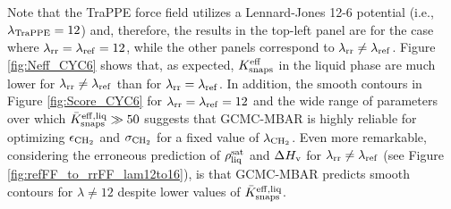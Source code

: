 \documentclass[journal=jced,manuscript=article]{achemso}
\begin{document}
Note that the TraPPE force field utilizes a Lennard-Jones 12-6 potential (i.e., $\lambda_{\rm TraPPE} = 12$) and, therefore, the results in the top-left panel are for the case where $\lambda_{\rm rr} = \lambda_{\rm ref} = 12$, while the other panels correspond to $\lambda_{\rm rr} \neq \lambda_{\rm ref}$. Figure \ref{fig:Neff_CYC6} shows that, as expected, $K_{\rm snaps}^{\rm eff}$ in the liquid phase are much lower for $\lambda_{\rm rr} \neq \lambda_{\rm ref}$ than for $\lambda_{\rm rr} = \lambda_{\rm ref}$. In addition, the smooth contours in Figure \ref{fig:Score_CYC6} for $\lambda_{\rm rr} = \lambda_{\rm ref} = 12$ and the wide range of parameters over which $\bar K_{\rm snaps}^{\rm eff, liq} \gg 50$ suggests that GCMC-MBAR is highly reliable for optimizing $\epsilon_{\rm CH_2}$ and $\sigma_{\rm CH_2}$ for a fixed value of $\lambda_{\rm CH_2}$. 
Even more remarkable, considering the erroneous prediction of $\rho_{\rm liq}^{\rm sat}$ and $\Delta H_{\rm v}$ for $\lambda_{\rm rr} \neq \lambda_{\rm ref}$ (see Figure \ref{fig:refFF_to_rrFF_lam12to16}), is that GCMC-MBAR predicts smooth contours for $\lambda \neq 12$ despite lower values of $\bar K_{\rm snaps}^{\rm eff, liq}$.      
\end{document}
